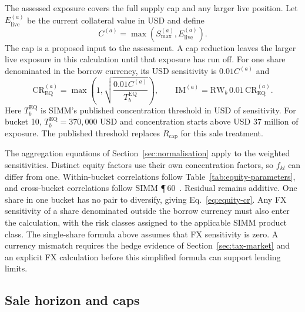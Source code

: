 The assessed exposure covers the full supply cap and any larger live position.
Let $E_{\mathrm{live}}^{(a)}$ be the current collateral value in USD and define
\begin{equation}\label{eq:equity-exposure}
C^{(a)}=\max\!\left(S_{\max}^{(a)},E_{\mathrm{live}}^{(a)}\right).
\end{equation}
The cap is a proposed input to the assessment. A cap reduction leaves the larger
live exposure in this calculation until that exposure has run off. For one share
denominated in the borrow currency, its USD sensitivity is $0.01C^{(a)}$ and
\begin{equation}\label{eq:equity-cr}
\mathrm{CR}^{(a)}_{\mathrm{EQ}}
=\max\!\left(1,\sqrt{\frac{0.01C^{(a)}}{T_b^{\mathrm{EQ}}}}\right),
\qquad
\mathrm{IM}^{(a)}=\mathrm{RW}_b\,0.01\,\mathrm{CR}^{(a)}_{\mathrm{EQ}}.
\end{equation}
Here $T_b^{\mathrm{EQ}}$ is SIMM's published concentration threshold in USD of
sensitivity. For bucket 10, $T_b^{\mathrm{EQ}}=370{,}000$ USD and concentration
starts above USD 37 million of exposure. The published threshold replaces
$R_{\mathrm{cap}}$ for this sale treatment.

The aggregation equations of Section~\ref{sec:normalisation} apply to the weighted
sensitivities. Distinct equity factors use their own concentration factors, so
$f_{kl}$ can differ from one. Within-bucket correlations follow
Table~\ref{tab:equity-parameters}, and cross-bucket correlations follow SIMM
\P\,60~\citep{isda_simm_v2_6}. Residual remains additive. One share in one bucket
has no pair to diversify, giving Eq.~\eqref{eq:equity-cr}. Any FX sensitivity of a
share denominated outside the borrow currency must also enter the calculation,
with the risk classes assigned to the applicable SIMM product class. The
single-share formula above assumes that FX sensitivity is zero. A currency mismatch
requires the hedge evidence of Section~\ref{sec:tax-market} and an explicit FX
calculation before this simplified formula can support lending limits.

\subsection{Sale horizon and caps}\label{sec:equity-execution}

